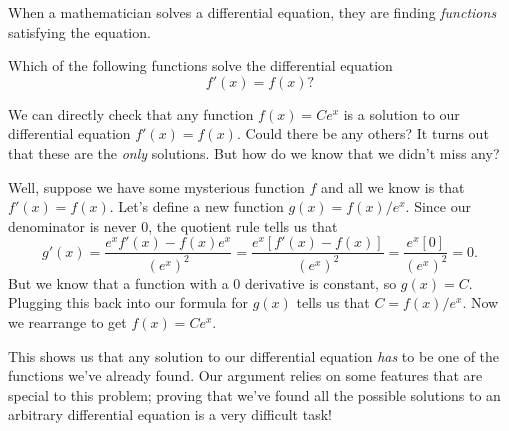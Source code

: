 \documentclass{ximera}
\begin{document}
When a mathematician solves a differential equation, they are finding
\textit{functions} satisfying the equation.
\begin{question}
  Which of the following functions solve the differential equation
  \[
  f'(x) = f(x)?
  \]
  \begin{selectAll}
  \end{selectAll}
\end{question}
\begin{remark}
    We can directly check that any function $f(x)=Ce^x$ is a solution to our differential equation $f'(x)=f(x)$. Could there be any others? It turns out that these are the \textit{only} solutions. But how do we know that we didn't miss any?
    
    Well, suppose we have some mysterious function $f$ and all we know is that $f'(x)=f(x)$. Let's define a new function $g(x)=f(x)/e^x$. Since our denominator is never 0, the quotient rule tells us that
    \[
	    g'(x)= \frac{e^x f'(x)- f(x) e^x}{(e^x)^2} = \frac{e^x[f'(x)- f(x)]}{(e^x)^2} = \frac{e^x[0]}{(e^x)^2}=0.
    \]
    But we know that a function with a 0 derivative is constant, so $g(x)=C$. Plugging this back into our formula for $g(x)$ tells us that $C=f(x)/e^x$. Now we rearrange to get $f(x)=Ce^x$.
    
    This shows us that any solution to our differential equation \textit{has} to be one of the functions we've already found. Our argument relies on some features that are special to this problem; proving that we've found all the possible solutions to an arbitrary differential equation is a very difficult task!    
\end{remark}
	
\end{document}
